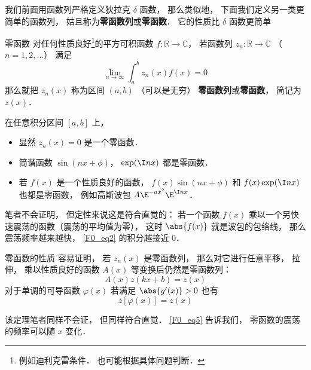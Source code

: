 
我们前面用函数列严格定义狄拉克 $\delta$ 函数， 那么类似地， 下面我们定义另一类更简单的函数列， 姑且称为\textbf{零函数列}或\textbf{零函数}． 它的性质比 $\delta$ 函数更简单
\begin{definition}{零函数}
对任何性质良好\footnote{例如迪利克雷条件． 也可能根据具体问题判断．}的平方可积函数 $f: \mathbb R \to \mathbb C$， 若函数列 $z_n: \mathbb R \to \mathbb C$ （$n = 1, 2, \dots$） 满足
\begin{equation}\label{F0_eq2}
\lim_{n\to \infty}\int_{a}^{b} z_n(x) f(x) = 0
\end{equation}
那么就把 $z_n(x)$ 称为区间 $(a,b)$ （可以是无穷） \textbf{零函数列}或\textbf{零函数}， 简记为 $z(x)$．
\end{definition}

\begin{example}{}\label{F0_ex1}
在任意积分区间 $[a,b]$ 上，
\begin{itemize}
\item 显然 $z_n(x) = 0$ 是一个零函数．
\item 简谐函数 $\sin(nx + \phi)$， $\exp(\I n x)$ 都是零函数．
\item 若 $f(x)$ 是一个性质良好的函数， $f(x)\sin(nx + \phi)$ 和 $f(x)\exp(\I n x)$ 也都是零函数， 例如高斯波包 $A\E^{-ax^2}\E^{\I nx}$．
\end{itemize}

笔者不会证明， 但定性来说这是符合直觉的： 若一个函数 $f(x)$ 乘以一个另快速震荡的函数（震荡的平均值为零）， 这时 $\abs{f(x)}$ 就是波包的包络线， 那么震荡频率越来越快， \autoref{F0_eq2} 的积分越接近 $0$．
\end{example}

\begin{theorem}{零函数的性质}
容易证明， 若 $z_n(x)$ 是零函数列， 那么对它进行任意平移， 拉伸， 乘以性质良好的函数 $A(x)$ 等变换后仍然是零函数列：
\begin{equation}
A(x) z(kx + b) = z(x)
\end{equation}
对于单调的可导函数 $\varphi(x)$ 若满足 $\abs{g'(x)} > 0$ 也有
\begin{equation}\label{F0_eq5}
z[\varphi(x)] = z(x)
\end{equation}
\end{theorem}
该定理笔者同样不会证， 但同样符合直觉． \autoref{F0_eq5} 告诉我们， 零函数的震荡的频率可以随 $x$ 变化．

